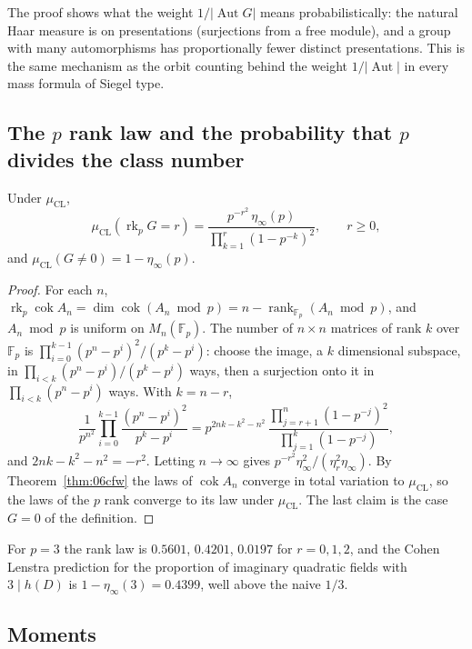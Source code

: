 The proof shows what the weight $1/|\operatorname{Aut}G|$ means probabilistically: the natural Haar measure is on presentations (surjections from a free module), and a group with many automorphisms has proportionally fewer distinct presentations. This is the same mechanism as the orbit counting behind the weight $1/|\operatorname{Aut}|$ in every mass formula of Siegel type.

\subsection{The $p$ rank law and the probability that $p$ divides the class number}

\begin{proposition}\label{prop:06cprank}
Under $\mu_{\mathrm{CL}}$,
\[
\mu_{\mathrm{CL}}(\operatorname{rk}_pG = r) = \frac{p^{-r^2}\,\eta_\infty(p)}{\prod_{k=1}^r(1-p^{-k})^2},\qquad r\ge0,
\]
and $\mu_{\mathrm{CL}}(G\ne0) = 1-\eta_\infty(p)$.
\end{proposition}

\begin{proof}
For each $n$, $\operatorname{rk}_p\operatorname{cok}A_n = \dim\operatorname{cok}(A_n\bmod p) = n-\operatorname{rank}_{\mathbb{F}_p}(A_n\bmod p)$, and $A_n\bmod p$ is uniform on $M_n(\mathbb{F}_p)$. The number of $n\times n$ matrices of rank $k$ over $\mathbb{F}_p$ is $\prod_{i=0}^{k-1}(p^n-p^i)^2/(p^k-p^i)$: choose the image, a $k$ dimensional subspace, in $\prod_{i<k}(p^n-p^i)/(p^k-p^i)$ ways, then a surjection onto it in $\prod_{i<k}(p^n-p^i)$ ways. With $k = n-r$,
\[
\frac{1}{p^{n^2}}\prod_{i=0}^{k-1}\frac{(p^n-p^i)^2}{p^k-p^i} = p^{2nk-k^2-n^2}\,\frac{\prod_{j=r+1}^n(1-p^{-j})^2}{\prod_{j=1}^{k}(1-p^{-j})},
\]
and $2nk-k^2-n^2 = -r^2$. Letting $n\to\infty$ gives $p^{-r^2}\eta_\infty^2/(\eta_r^2\eta_\infty)$. By Theorem~\ref{thm:06cfw} the laws of $\operatorname{cok}A_n$ converge in total variation to $\mu_{\mathrm{CL}}$, so the laws of the $p$ rank converge to its law under $\mu_{\mathrm{CL}}$. The last claim is the case $G=0$ of the definition.
\end{proof}

For $p=3$ the rank law is $0.5601$, $0.4201$, $0.0197$ for $r = 0,1,2$, and the Cohen Lenstra prediction for the proportion of imaginary quadratic fields with $3\mid h(D)$ is $1-\eta_\infty(3) = 0.4399$, well above the naive $1/3$.

\subsection{Moments}

